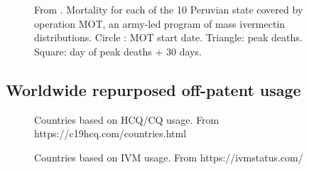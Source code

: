 \documentclass[11pt,a4paper,notitlepage]{report}
\begin{document}
\begin{figure}[h]
    \centering
    \caption{From \citet{Chamie2021}. Mortality for each of the 10 Peruvian state covered by operation MOT, an army-led program of mass ivermectin distributions. Circle : MOT start date. Triangle: peak deaths. Square: day of peak deaths + 30 days.}
    \label{fig:peru-operation-mot}
\end{figure}

\clearpage

\subsection*{Worldwide repurposed off-patent usage}

\begin{figure}[h]
    \centering
    \caption{Countries based on HCQ/CQ usage. From https://c19hcq.com/countries.html}
    \label{fig:hydroxychloroquine-countries}
\end{figure}

\begin{figure}[h]
    \centering
    \caption{Countries based on IVM usage. From https://ivmstatus.com/}
    \label{fig:ivermectin-countries}
\end{figure}








 
 
\end{document}

